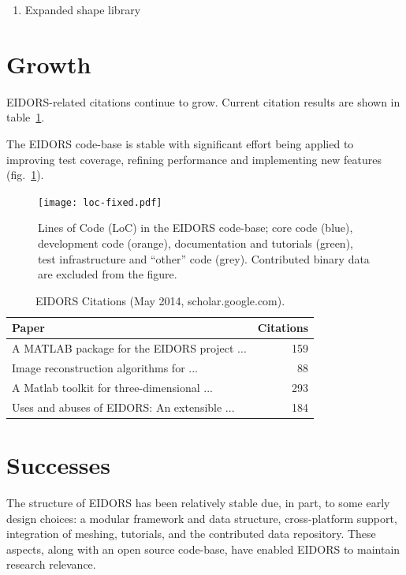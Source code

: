 \documentclass[10pt,a4paper]{article}
\begin{document}
\begin{multicols}{2}
\begin{enumerate}
\item Expanded shape library
\end{enumerate}

\section{Growth}
EIDORS-related citations continue to grow. Current citation results are
shown in table~\ref{tbl:cite}.

The EIDORS code-base is stable with significant effort being applied to
improving test coverage, refining performance and implementing new features
(fig.~\ref{fig:loc}).

\begin{figure}[H]
  \vspace{-2.5em}
\centering
\texttt{[image: loc-fixed.pdf]}
\caption{\label{fig:loc}%
  Lines of Code (LoC) in the EIDORS code-base; core code (blue), development code (orange),
  documentation and tutorials (green), test infrastructure and ``other'' code (grey).
 Contributed binary data are excluded from the figure.
}
\end{figure}
\vspace{-1.5em}
\begin{table}[H]
  \footnotesize
\centering
\caption{\label{tbl:cite} EIDORS Citations
 (May 2014, scholar.google.com).
}
\begin{tabular}{lr}
  \toprule
  Paper & Citations \\
  \midrule
  \cite{vauhkonen2001} A MATLAB package for the EIDORS project {\tiny ...}  & 159 \\
  \cite{polydorides2002phd} Image reconstruction algorithms for {\tiny ...}  & 88 \\
  \cite{polydorides2002matlab} A Matlab toolkit for three-dimensional {\tiny ...}  & 293 \\
  \cite{adler2006} Uses and abuses of {EIDORS}: An extensible {\tiny ...} & 184 \\
  \bottomrule
\end{tabular}
\vspace{-1em}
\end{table}

\section{Successes}
The structure of EIDORS has been relatively stable due, in part, to some early design choices:
a modular framework and data structure,
cross-platform support, integration of meshing,
tutorials, and the contributed data repository.
These aspects, along with an open source code-base, have enabled EIDORS to
maintain research relevance.


\end{multicols}
\end{document}
